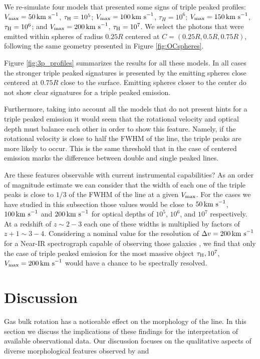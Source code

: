 \documentclass{emulateapj}
\newcommand{\ly}{{\ifmmode{{\rm Ly}\alpha~}\else{Ly$\alpha$~}\fi}}
\newcommand{\kms}{{\ifmmode{{\mathrm{\,km\ s}^{-1}}}\else{\,km~s$^{-1}$}\fi}}
\begin{document}
We re-simulate four models that presented some signs of triple peaked
profiles: $V_{\rm max}=50\kms$, $\tau_{\rm H}=10^{5}$; $V_{\rm
  max}=100\kms$, $\tau_{H}=10^{6}$; $V_{\rm max}=150\kms$, $\tau_{\rm
  H}=10^6$; and $V_{\rm max}=200\kms$, $\tau_{\rm H}=10^{7}$. We
select the photons that were emitted within spheres of radius $0.25R$
centered at $C=(0.25R, 0.5R, 0.75R)$, following the same
geometry presented in Figure \ref{fig:OCspheres}.

Figure \ref{fig:3p_profiles} summarizes the results for all these
models. In all cases the stronger triple peaked signatures is
presented by the emitting spheres close centered at $0.75R$ close to
the surface. Emitting spheres closer to the center do not show clear
signatures for a triple peaked emission.

Furthermore, taking into account all the models that do not present hints for
a triple peaked emission it would seem that the rotational velocity
and optical depth must balance each other in order to show this feature.
 Namely, if the rotational velocity is close to half the FWHM
of the line, the triple peaks are more likely to occur. This is the
same threshold that in the case of centered emission marks the
difference between double and single peaked lines.


Are these features observable with current instrumental capabilities?
As an order of magnitude estimate we can consider that the width of
each one of the triple peaks is close to $1/3$ of the FWHM of the line
at a given $V_{\rm max}$. For the cases we have studied in this
subsection those values would be close to $50\kms$, $100\kms$ and
$200\kms$ for optical depths of $10^5$, $10^6$, and $10^7$
respectively. At a redshift of $z\sim 2-3$ each one of these widths
is multiplied by factors of $z+1\sim 3-4$. Considering a nominal value
for the resolution of $\Delta v=200\kms$ for a Near-IR spectrograph capable of observing
those galaxies \citep{Kulas12}, we find that only the case of triple
peaked emission for the most massive object $\tau_{\rm H}, 10^{7}$,
$V_{\rm max}=200\kms$ would have a chance to be spectrally resolved. 


\section{Discussion}
\label{sec:discussion}

Gas bulk rotation has a noticeable effect on the morphology of the
 \ly line. In this section we discuss the implications of these
 findings for the interpretation of available observational data. Our
 discussion focuses on the qualitative aspects of diverse
 morphological features observed by \cite{Kulas12} and \cite{Yamada2012}
\end{document}
